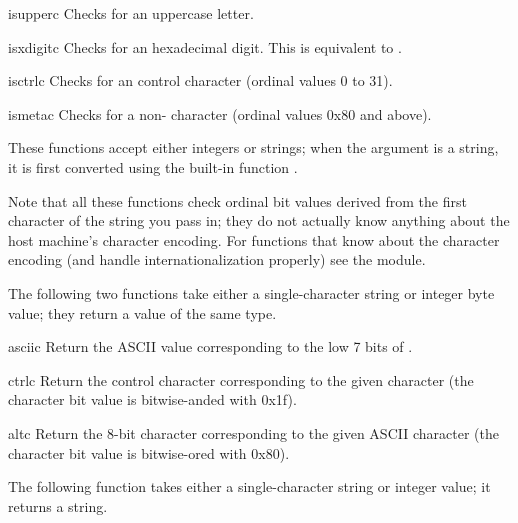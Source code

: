 \begin{funcdesc}{isupper}{c}
Checks for an \ASCII{} uppercase letter.
\end{funcdesc}

\begin{funcdesc}{isxdigit}{c}
Checks for an \ASCII{} hexadecimal digit.  This is equivalent to
.
\end{funcdesc}

\begin{funcdesc}{isctrl}{c}
Checks for an \ASCII{} control character (ordinal values 0 to 31).
\end{funcdesc}

\begin{funcdesc}{ismeta}{c}
Checks for a non-\ASCII{} character (ordinal values 0x80 and above).
\end{funcdesc}

These functions accept either integers or strings; when the argument
is a string, it is first converted using the built-in function
.

Note that all these functions check ordinal bit values derived from the 
first character of the string you pass in; they do not actually know
anything about the host machine's character encoding.  For functions 
that know about the character encoding (and handle
internationalization properly) see the  module.

The following two functions take either a single-character string or
integer byte value; they return a value of the same type.

\begin{funcdesc}{ascii}{c}
Return the ASCII value corresponding to the low 7 bits of .
\end{funcdesc}

\begin{funcdesc}{ctrl}{c}
Return the control character corresponding to the given character
(the character bit value is bitwise-anded with 0x1f).
\end{funcdesc}

\begin{funcdesc}{alt}{c}
Return the 8-bit character corresponding to the given ASCII character
(the character bit value is bitwise-ored with 0x80).
\end{funcdesc}

The following function takes either a single-character string or
integer value; it returns a string.


